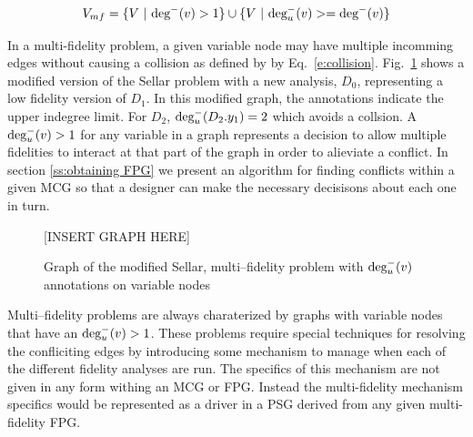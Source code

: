   \begin{equation}
    V_{mf} = \{ V \ | \  \textrm{deg}^-(v)>1 \} \cup \{ V \ | \  \textrm{deg}^-_u(v)>=\textrm{deg}^-(v) \}
  \end{equation}

  In a multi-fidelity problem, a given variable node may have multiple incomming 
  edges without causing a collision as defined by by Eq.~\ref{e:collision}. 
  Fig.~\ref{f:collision_example} shows a modified version of the Sellar problem 
  with a new analysis, $D_0$, representing a low fidelity version of $D_1$. 
  In this modified graph, the annotations indicate the upper indegree limit. For 
  $D_2$, $\textrm{deg}^-_u(D_2.y_1) = 2$ which avoids a collsion. A  
  $\textrm{deg}^-_u(v) > 1$ for any variable in a graph represents a decision to 
  allow multiple fidelities to interact at that part of the graph in order to alieviate
  a conflict. In section \ref{ss:obtaining FPG} we present an algorithm for finding 
  conflicts within a given MCG so that a designer can make the necessary decisisons about each 
  one in turn. 

  \begin{figure}
    \begin{center}
    [INSERT GRAPH HERE]
    \caption{Graph of the modified Sellar, multi--fidelity problem with $\textrm{deg}^-_u(v)$ annotations on variable nodes\label{f:collision_example}}
  \end{center}
  \end{figure}

  Multi--fidelity problems are always charaterized by graphs with variable 
  nodes that have an $\textrm{deg}^-_u(v) > 1$. These problems require 
  special techniques for resolving the confliciting edges by introducing some mechanism
  to manage when each of the different fidelity analyses are 
  run\cite{march2012provably,alexandrov2001approximation,Huang_Allen_Notz_Miller_2006}.
  The specifics of this mechanism are not given in any form withing an MCG or 
  FPG. Instead the multi-fidelity mechanism specifics would be represented as a 
  driver in a PSG derived from any given multi-fidelity FPG. 


